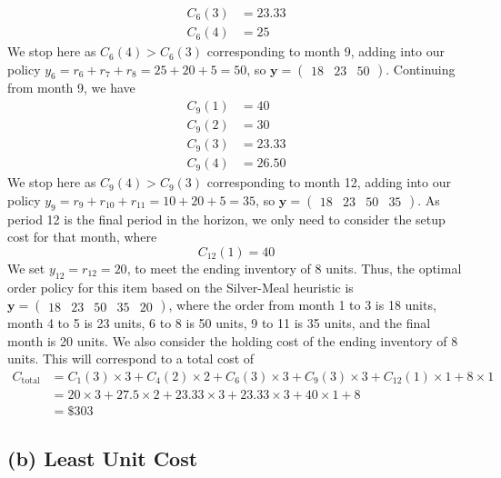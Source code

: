 \documentclass[12pt]{article}
\begin{document}
\begin{align*}
    C_{6}(3) &= 23.33 \\ 
    C_{6}(4) &= 25 
\end{align*} We stop here as $C_{6}(4) > C_{6}(3)$ corresponding to month 9, adding into our policy $y_{6} = r_{6} + r_{7} + r_{8} = 25 + 20 + 5 = 50$, so $\mathbf{y} = \begin{pmatrix}
    18 & 23 & 50
\end{pmatrix}$. Continuing from month 9, we have \begin{align*}
    C_{9}(1) &= 40 \\ 
    C_{9}(2) &= 30 \\ 
    C_{9}(3) &= 23.33 \\ 
    C_{9}(4) &= 26.50 
\end{align*} We stop here as $C_{9}(4) > C_{9}(3)$ corresponding to month 12, adding into our policy $y_{9} = r_{9} + r_{10} + r_{11} = 10 + 20 + 5 = 35$, so $\mathbf{y} = \begin{pmatrix}
    18 & 23 & 50 & 35
\end{pmatrix}$. As period 12 is the final period in the horizon, we only need to consider the setup cost for that month, where \begin{equation*}
    C_{12}(1) = 40
\end{equation*} We set $y_{12} = r_{12} = 20$, to meet the ending inventory of 8 units. Thus, the optimal order policy for this item based on the Silver-Meal heuristic is $\mathbf{y} = \begin{pmatrix}
    18 & 23 & 50 & 35 & 20 
\end{pmatrix}$, where the order from month 1 to 3 is 18 units, month 4 to 5 is 23 units, 6 to 8 is 50 units, 9 to 11 is 35 units, and the final month is 20 units. We also consider the holding cost of the ending inventory of 8 units. This will correspond to a total cost of \begin{align*}
    C_{\text{total}} &= C_{1}(3)\times 3 + C_{4}(2) \times 2+ C_{6}(3) \times 3+ C_{9}(3) \times 3 + C_{12}(1) \times 1 + 8 \times 1 \\ 
    &= 20\times 3 + 27.5\times 2 + 23.33\times 3 + 23.33\times 3 + 40 \times 1 + 8 \\ 
    &= \boxed{\$303}
\end{align*} 

\subsection*{(b) Least Unit Cost}
\end{document}
